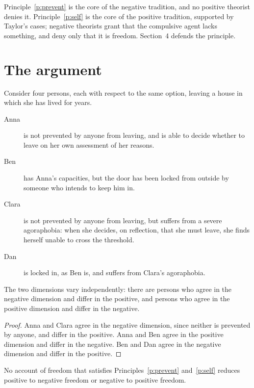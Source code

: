 \documentclass{situationist-preprint}
\begin{document}
Principle~\ref{p:prevent} is the core of the negative tradition, and no positive theorist denies it. Principle~\ref{p:self} is the core of the positive tradition, supported by Taylor's cases; negative theorists grant that the compulsive agent lacks something, and deny only that it is freedom. Section~4 defends the principle.

\section{The argument}

Consider four persons, each with respect to the same option, leaving a house in which she has lived for years.

\begin{description}
\item[Anna] is not prevented by anyone from leaving, and is able to decide whether to leave on her own assessment of her reasons.
\item[Ben] has Anna's capacities, but the door has been locked from outside by someone who intends to keep him in.
\item[Clara] is not prevented by anyone from leaving, but suffers from a severe agoraphobia: when she decides, on reflection, that she must leave, she finds herself unable to cross the threshold.
\item[Dan] is locked in, as Ben is, and suffers from Clara's agoraphobia.
\end{description}

\begin{lemma}\label{l:indep}
The two dimensions vary independently: there are persons who agree in the negative dimension and differ in the positive, and persons who agree in the positive dimension and differ in the negative.
\end{lemma}

\begin{proof}
Anna and Clara agree in the negative dimension, since neither is prevented by anyone, and differ in the positive. Anna and Ben agree in the positive dimension and differ in the negative. Ben and Dan agree in the negative dimension and differ in the positive.
\end{proof}

\begin{theorem}\label{t:irreducible}
No account of freedom that satisfies Principles~\ref{p:prevent} and~\ref{p:self} reduces positive to negative freedom or negative to positive freedom.
\end{theorem}
\end{document}
